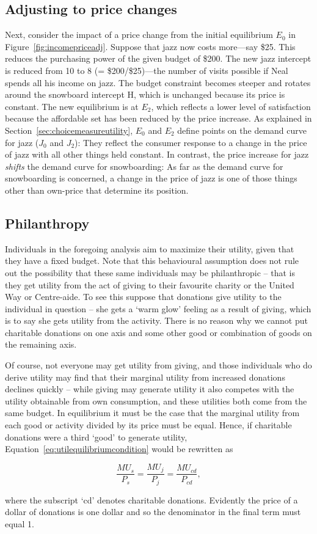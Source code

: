 

\subsection*{Adjusting to price changes}

Next, consider the impact of a price change from the initial equilibrium $E_0$ in Figure~\ref{fig:incomepriceadj}. Suppose that jazz now costs more---say \$25. This reduces the purchasing power of the given budget of \$200. The new jazz intercept is reduced from 10 to 8 (= \$200/\$25)---the number of visits possible if Neal spends all his income on jazz. The budget constraint becomes steeper and rotates around the snowboard intercept H, which is unchanged because its price is constant. The new equilibrium is at $E_2$, which reflects a lower level of satisfaction because the affordable set has been reduced by the price increase. As explained in Section~\ref{sec:choicemeasureutility}, $E_0$ and $E_2$ define points on the demand curve for jazz ($J_0$ and $J_2$): They reflect the consumer response to a change in the price of jazz with all other things held constant. In contrast, the price increase for jazz \textit{shifts} the demand curve for snowboarding: As far as the demand curve for snowboarding is concerned, a change in the price of jazz is one of those things other than own-price that determine its position.

\subsection*{Philanthropy}

Individuals in the foregoing analysis aim to maximize their utility, given that they have a fixed budget. Note that this behavioural assumption does not rule out the possibility that these same individuals may be philanthropic -- that is they get utility from the act of giving to their favourite charity or the United Way or Centre-aide. To see this suppose that donations give utility to the individual in question -- she gets a `warm glow' feeling as a result of giving, which is to say she gets utility from the activity. There is no reason why we cannot put charitable donations on one axis and some other good or combination of goods on the remaining axis. 

Of course, not everyone may get utility from giving, and those individuals who do derive utility may find that their marginal utility from increased donations declines quickly -- while giving may generate utility it also competes with the utility obtainable from own consumption, and these utilities both come from the same budget. In equilibrium it must be the case that the marginal utility from each good or activity divided by its price must be equal. Hence, if charitable donations were a third `good' to generate utility, Equation~\ref{eq:utilequilibriumcondition} would be rewritten as 

\begin{equation*}
\frac{MU_s}{P_s}=\frac{MU_j}{P_j}=\frac{MU_{cd}}{P_{cd}},
\end{equation*}

where the subscript `cd' denotes charitable donations. Evidently the price of a dollar of donations is one dollar and so the denominator in the final term must equal 1.